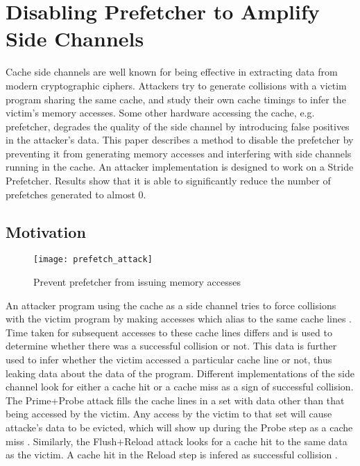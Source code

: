 \chapter{Disabling Prefetcher to Amplify Side Channels}

Cache side channels are well known for being effective
in extracting data from modern cryptographic ciphers.
Attackers try to generate collisions with a victim program sharing
the same cache, and study their own cache timings to infer the
victim's memory accesses.
Some other hardware accessing the cache, e.g. prefetcher, degrades the
quality of the side channel by introducing false positives in the attacker's
data.
This paper describes a method to disable the prefetcher by preventing
it from generating memory accesses and interfering with side channels
running in the cache.
An attacker implementation is designed to work on a Stride Prefetcher.
Results show that it is able to significantly reduce the number of prefetches
generated to almost 0.

\section{Motivation}

\begin{figure}[ht]
    \centering
    \texttt{[image: prefetch\_attack]}
    \caption{Prevent prefetcher from issuing memory accesses}
    \label{fig:prefetch_attack}
\end{figure}

An attacker program using the cache as a side channel tries to force
collisions with the victim program by making accesses which alias to the
same cache lines \cite{osvik-cache-attacks}.
Time taken for subsequent accesses to these cache lines differs and is used to
determine whether there was a successful collision or not.
This data is further used to infer whether the victim accessed a particular
cache line or not, thus leaking data about the data of the program.
Different implementations of the side channel look for either a cache
hit or a cache miss as a sign of successful collision.
The Prime+Probe attack fills the cache lines in a set with data other than
that being accessed by the victim. Any access by the victim to that set will
cause attacke's data to be evicted, which will show up during the Probe step
as a cache miss \cite{osvik-cache-attacks}.
Similarly, the Flush+Reload attack looks for a cache hit to the same
data as the victim. A cache hit in the Reload step is infered as successful
collision \cite{percival-rsa}.

